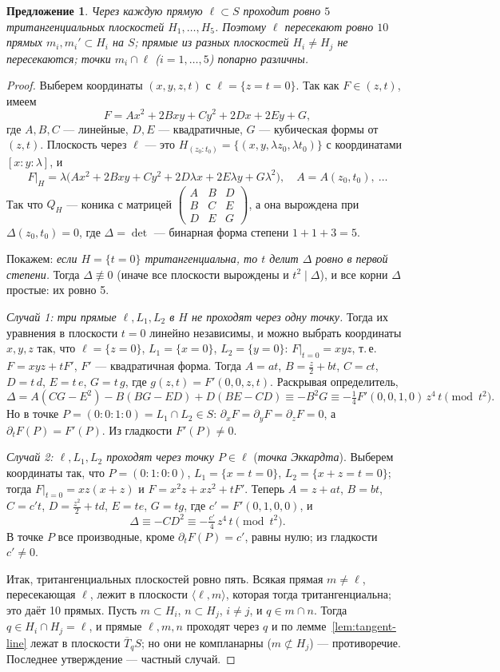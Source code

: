 \documentclass[11pt,a4paper]{article}
\theoremstyle{plain}
\newtheorem{proposition}[theorem]{Предложение}
\theoremstyle{definition}
\theoremstyle{remark}
\begin{document}
\begin{proposition}\label{prop:five-planes}
Через каждую прямую $\ell\subset S$ проходит ровно $5$ тритангенциальных плоскостей $H_1,\dots,H_5$. Поэтому
$\ell$ пересекают ровно $10$ прямых $m_i,m_i'\subset H_i$ на $S$; прямые из разных плоскостей $H_i\ne H_j$ не
пересекаются; точки $m_i\cap\ell$ ($i=1,\dots,5$) попарно различны.
\end{proposition}
\begin{proof}
Выберем координаты $(x,y,z,t)$ с $\ell=\{z=t=0\}$. Так как $F\in(z,t)$, имеем
\[
F=Ax^2+2Bxy+Cy^2+2Dx+2Ey+G,
\]
где $A,B,C$ --- линейные, $D,E$ --- квадратичные, $G$ --- кубическая формы от $(z,t)$. Плоскость через $\ell$ ---
это $H_{(z_0:t_0)}=\{(x,y,\lambda z_0,\lambda t_0)\}$ с координатами $[x:y:\lambda]$, и
\[
F|_H=\lambda\big(A x^2+2Bxy+Cy^2+2D\lambda x+2E\lambda y+G\lambda^2\big),\quad A=A(z_0,t_0),\ \dots
\]
Так что $Q_H$ --- коника с матрицей $\begin{pmatrix}A&B&D\\B&C&E\\D&E&G\end{pmatrix}$, а она вырождена при
$\Delta(z_0,t_0)=0$, где $\Delta=\det$ --- бинарная форма степени $1+1+3=5$.

Покажем: \emph{если $H=\{t=0\}$ тритангенциальна, то $t$ делит $\Delta$ ровно в первой степени.} Тогда $\Delta\not\equiv0$
(иначе все плоскости вырождены и $t^2\mid\Delta$), и все корни $\Delta$ простые: их ровно 5.

\emph{Случай 1: три прямые $\ell,L_1,L_2$ в $H$ не проходят через одну точку.} Тогда их уравнения в плоскости
$t=0$ линейно независимы, и можно выбрать координаты $x,y,z$ так, что $\ell=\{z=0\}$, $L_1=\{x=0\}$,
$L_2=\{y=0\}$: $F|_{t=0}=xyz$, т.\,е. $F=xyz+tF'$, $F'$ --- квадратичная форма. Тогда
$A=at$, $B=\frac z2+bt$, $C=ct$, $D=t\,d$, $E=t\,e$, $G=t\,g$, где $g(z,t)=F'(0,0,z,t)$. Раскрывая
определитель,
\[
\Delta=A(CG-E^2)-B(BG-ED)+D(BE-CD)\equiv-B^2G\equiv-\tfrac14F'(0,0,1,0)\,z^4\,t\pmod{t^2}.
\]
Но в точке $P=(0:0:1:0)=L_1\cap L_2\in S$: $\partial_xF=\partial_yF=\partial_zF=0$, а $\partial_tF(P)=F'(P)$.
Из гладкости $F'(P)\ne0$.

\emph{Случай 2: $\ell,L_1,L_2$ проходят через точку $P\in\ell$} (\emph{точка Эккардта}). Выберем координаты
так, что $P=(0:1:0:0)$, $L_1=\{x=t=0\}$, $L_2=\{x+z=t=0\}$; тогда $F|_{t=0}=xz(x+z)$ и $F=x^2z+xz^2+tF'$.
Теперь $A=z+at$, $B=bt$, $C=c't$, $D=\frac{z^2}2+td$, $E=te$, $G=tg$, где $c'=F'(0,1,0,0)$, и
\[
\Delta\equiv-CD^2\equiv-\tfrac{c'}4\,z^4\,t\pmod{t^2}.
\]
В точке $P$ все производные, кроме $\partial_tF(P)=c'$, равны нулю; из гладкости $c'\ne0$.

Итак, тритангенциальных плоскостей ровно пять. Всякая прямая $m\ne\ell$, пересекающая $\ell$, лежит в плоскости
$\langle\ell,m\rangle$, которая тогда тритангенциальна; это даёт 10 прямых. Пусть $m\subset H_i$, $n\subset H_j$,
$i\ne j$, и $q\in m\cap n$. Тогда $q\in H_i\cap H_j=\ell$, и прямые $\ell,m,n$ проходят через $q$ и по
лемме~\ref{lem:tangent-line} лежат в плоскости $\overline T_qS$; но они не компланарны ($m\not\subset H_j$) ---
противоречие. Последнее утверждение --- частный случай.
\end{proof}
\end{document}
